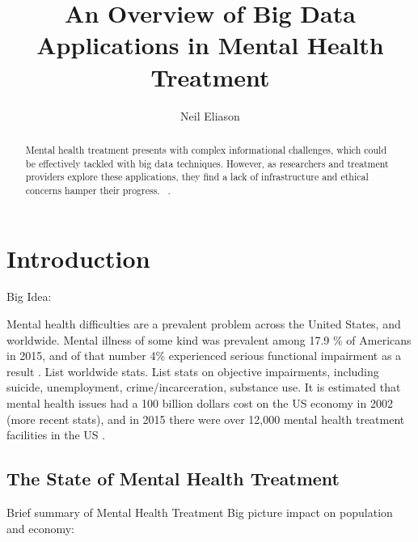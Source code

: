 \documentclass[sigconf]{acmart}
\begin{document}
\title{An Overview of Big Data Applications in Mental Health Treatment}


\author{Neil Eliason}


\renewcommand{\shortauthors}{Eliason}


\begin{abstract}
Mental health treatment presents with complex informational challenges, which could be effectively tackled with big data techniques. However, as researchers and treatment providers explore these applications, they find a lack of infrastructure and ethical concerns hamper their progress.
 ~\cite{BigDataBipolar,MachineLearnBipolar,DetectDepressionSocialMedia,gartnerBDdef,BDConcepts,nihmStats}.
\end{abstract}



\maketitle

\section{Introduction}
Big Idea:

Mental health difficulties are a prevalent problem across the United States, and worldwide. Mental illness of some kind was prevalent among 17.9 \% of Americans in 2015, and of that number 4\% experienced serious functional impairment as a result \cite{nihmStats}. List worldwide stats. List stats on objective impairments, including suicide, unemployment, crime/incarceration, substance use.
It is estimated that mental health issues had a 100 billion dollars cost on the US economy in 2002 \cite{nihmStats} (more recent stats), and in 2015 there were over 12,000 mental health treatment facilities in the US \cite{N-MHSS2015}.


\subsection{The State of Mental Health Treatment}
Brief summary of Mental Health Treatment
Big picture impact on population and economy:
\end{document}
